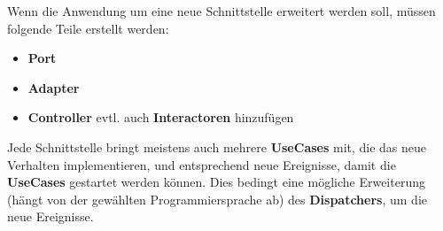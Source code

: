 Wenn die Anwendung um eine neue Schnittstelle erweitert werden soll, müssen folgende Teile erstellt werden:
\begin{itemize}
    \item \textbf{Port}
    \item \textbf{Adapter}
    \item \textbf{Controller} evtl. auch \textbf{Interactoren} hinzufügen
\end{itemize}

Jede Schnittstelle bringt meistens auch mehrere \textbf{UseCases} mit, die das neue Verhalten implementieren, und entsprechend neue 
Ereignisse, damit die \textbf{UseCases} gestartet werden können. 
Dies bedingt eine mögliche Erweiterung (hängt von der gewählten Programmiersprache ab) des \textbf{Dispatchers}, um die neue Ereignisse.
